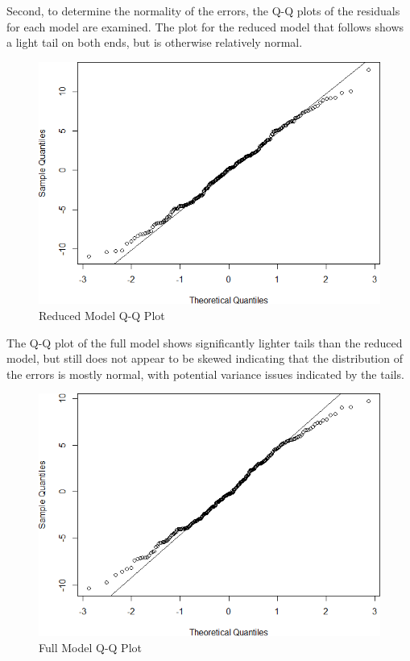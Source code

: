 \documentclass[a4paper, 11pt]{article}
\begin{document}
Second, to determine the normality of the errors, the Q-Q plots of the residuals for each model are examined. The plot for the reduced model that follows shows a light tail on both ends, but is otherwise relatively normal.

\begin{figure}[H]
	\centering
	\caption{Reduced Model Q-Q Plot}
	\includegraphics[width=\textwidth]{reduced_qq_plot.png}
\end{figure}

The Q-Q plot of the full model shows significantly lighter tails than the reduced model, but still does not appear to be skewed indicating that the distribution of the errors is mostly normal, with potential variance issues indicated by the tails.
\begin{figure}[H]
	\centering
	\caption{Full Model Q-Q Plot}
	\includegraphics[width=\textwidth]{full_qq_plot.png}
\end{figure}
\end{document}
